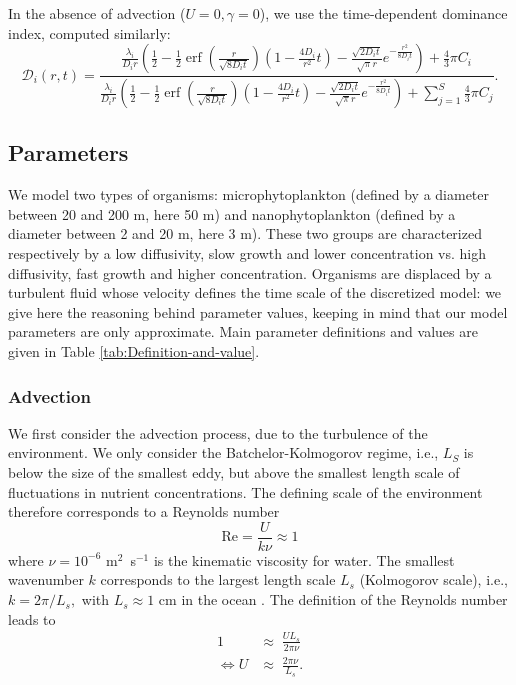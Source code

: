 \documentclass[12pt,english]{article}
\DeclareMathOperator\erf{erf}
\begin{document}
In the absence of advection ($U=0,\gamma=0$), we use the time-dependent
dominance index, computed similarly: 
\begin{equation}
\mathcal{D}_{i}(r,t)=\frac{\frac{\lambda_{i}}{D_{i}r}\left(\frac{1}{2}-\frac{1}{2}\erf\left(\frac{r}{\sqrt{8D_{i}t}}\right)\left(1-\frac{4D_{i}}{r^{2}}t\right)-\frac{\sqrt{2D_{i}t}}{\sqrt{\pi}r}e^{-\frac{r^{2}}{8D_{i}t}}\right)+\frac{4}{3}\pi C_{i}}{\frac{\lambda_{i}}{D_{i}r}\left(\frac{1}{2}-\frac{1}{2}\erf\left(\frac{r}{\sqrt{8D_{i}t}}\right)\left(1-\frac{4D_{i}}{r^{2}}t\right)-\frac{\sqrt{2D_{i}t}}{\sqrt{\pi}r}e^{-\frac{r^{2}}{8D_{i}t}}\right)+\sum_{j=1}^{S}\frac{4}{3}\pi C_{j}}.\label{eq:dom_noadv}
\end{equation}


\subsection*{Parameters}

We model two types of organisms: microphytoplankton (defined by a
diameter between 20 and 200 \textmu m, here 50 \textmu m) and nanophytoplankton
(defined by a diameter between 2 and 20 \textmu m, here 3 \textmu m).
These two groups are characterized respectively by a low diffusivity,
slow growth and lower concentration vs. high diffusivity, fast growth
and higher concentration. Organisms are displaced by a turbulent fluid
whose velocity defines the time scale of the discretized model: we
give here the reasoning behind parameter values, keeping in mind that
our model parameters are only approximate. Main parameter definitions
and values are given in Table \ref{tab:Definition-and-value}.

\subsubsection*{Advection}

We first consider the advection process, due to the turbulence of
the environment. We only consider the Batchelor-Kolmogorov regime,
i.e., $L_S$ is below the size of the smallest
eddy, but above the smallest length scale of fluctuations in nutrient
concentrations. The defining scale of the environment therefore corresponds
to a Reynolds number 
\begin{equation}
\text{Re}=\frac{U}{k\nu}\approx1\label{eq:reynolds_def}
\end{equation}
where $\nu=10^{-6}$ m$^{2}$~s$^{-1}$ is the kinematic viscosity
for water. The smallest wavenumber $k$ corresponds to the largest
length scale $L_{s}$ (Kolmogorov scale), i.e., $k=2\pi/L_{s},$ with
$L_{s}\approx1$ cm in the ocean \citep{barton_impact_2014}. The
definition of the Reynolds number leads to 
\begin{equation}
\begin{array}{cc}
1 & \approx\;\frac{UL_{s}}{2\pi\nu}\\
\Leftrightarrow U & \approx\;\frac{2\pi\nu}{L_{s}}.
\end{array}\label{eq:compute_U}
\end{equation}
\end{document}
